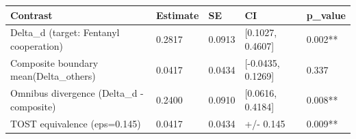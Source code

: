 
\begin{tabular}[t]{lllll}
\toprule
Contrast & Estimate & SE & CI & p\_value\\
\midrule
Delta\_d (target: Fentanyl cooperation) & 0.2817 & 0.0913 & {}[0.1027, 0.4607] & 0.002**\\
Composite boundary mean(Delta\_others) & 0.0417 & 0.0434 & {}[-0.0435, 0.1269] & 0.337\\
Omnibus divergence (Delta\_d - composite) & 0.2400 & 0.0910 & {}[0.0616, 0.4184] & 0.008**\\
TOST equivalence (eps=0.145) & 0.0417 & 0.0434 & +/- 0.145 & 0.009**\\
\bottomrule
\end{tabular}
